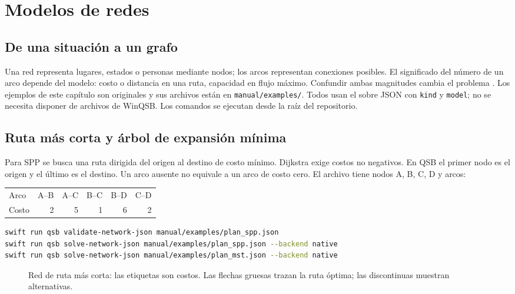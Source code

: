 \chapter{Modelos de redes}
\label{chap:redes}

\section{De una situación a un grafo}
Una red representa lugares, estados o personas mediante nodos; los arcos
representan conexiones posibles. El significado del número de un arco depende
del modelo: costo o distancia en una ruta, capacidad en flujo máximo. Confundir
ambas magnitudes cambia el problema \cite{ahuja1993network}.
Los ejemplos de este capítulo son originales y sus archivos están en
\texttt{manual/examples/}. Todos usan el sobre JSON con \texttt{kind} y
\texttt{model}; no se necesita disponer de archivos de WinQSB.
Los comandos se ejecutan desde la raíz del repositorio.

\section{Ruta más corta y árbol de expansión mínima}
Para SPP se busca una ruta dirigida del origen al destino de costo mínimo.
Dijkstra exige costos no negativos. En QSB el primer nodo es el origen y el
último es el destino. Un arco ausente no equivale a un arco de costo cero.
El archivo  tiene nodos A, B, C, D y arcos:
\begin{center}
\begin{tabular}{lrrrrr}\toprule
Arco & A--B & A--C & B--C & B--D & C--D \\
Costo & 2 & 5 & 1 & 6 & 2 \\
\bottomrule\end{tabular}
\end{center}
\begin{lstlisting}[language=bash]
swift run qsb validate-network-json manual/examples/plan_spp.json
swift run qsb solve-network-json manual/examples/plan_spp.json --backend native
swift run qsb solve-network-json manual/examples/plan_mst.json --backend native
\end{lstlisting}
\begin{figure}[htbp]
\centering

\caption{Red de ruta más corta: las etiquetas son costos. Las flechas gruesas trazan la ruta óptima; las discontinuas muestran alternativas.}
\label{fig:shortest-path}
\end{figure}

